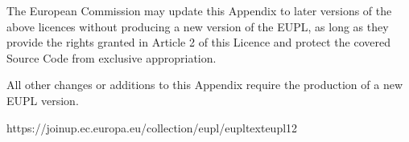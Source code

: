 \documentclass[letterpaper,10pt,english]{sphinxmanual}
\begin{document}
\sphinxAtStartPar
The European Commission may update this Appendix to later versions of the above
licences without producing a new version of the EUPL, as long as they provide
the rights granted in Article 2 of this Licence and protect the covered Source
Code from exclusive appropriation.

\sphinxAtStartPar
All other changes or additions to this Appendix require the production of a new
EUPL version.

\sphinxAtStartPar
https://joinup.ec.europa.eu/collection/eupl/eupl\sphinxhyphen{}text\sphinxhyphen{}eupl\sphinxhyphen{}12


\renewcommand{\indexname}{Python Module Index}
\begin{sphinxtheindex}
\let\bigletter\sphinxstyleindexlettergroup
\bigletter{e}
\item\relax{}
\item\relax{}
\item\relax{}
\item\relax{}
\end{sphinxtheindex}

\renewcommand{\indexname}{Index}
\printindex
\end{document}
